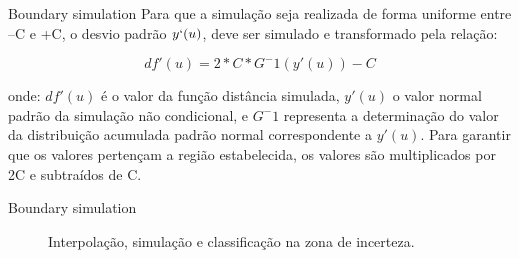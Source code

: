 \documentclass[aspectratio=169]{beamer}
\begin{document}
\begin{frame}{Boundary simulation}
Para que a simulação seja realizada de forma uniforme entre –C e +C, o desvio padrão $y`(u)$, deve ser simulado e transformado pela relação:


	\begin{equation}
	df'(u)=2*C*G^-1(y'(u))-C
	\end{equation}
	
onde: $df'(u)$ é o valor da função distância simulada, $y'(u)$ o valor normal padrão da simulação não condicional, e $G^-1$ representa a determinação do valor da distribuição acumulada padrão normal correspondente a $y'(u)$. Para garantir que os valores pertençam a região estabelecida, os valores são multiplicados por 2C e subtraídos de C.
	
\end{frame}

\begin{frame}{Boundary simulation}
	\begin{figure}[H] 
		\caption{Interpolação, simulação e classificação na zona de incerteza.} \label{cat1_bound_sim}
		\centering
	\end{figure}
\end{frame}
\end{document}
